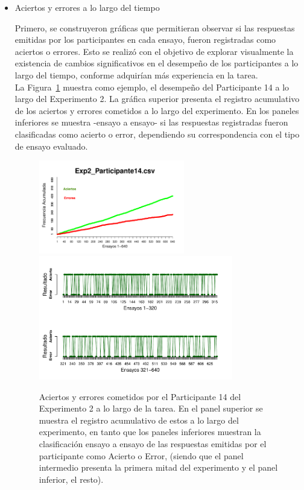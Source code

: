 \begin{itemize}
\item Aciertos y errores a lo largo del tiempo

Primero, se construyeron gráficas que permitieran observar si las respuestas emitidas por los participantes en cada ensayo, fueron registradas como aciertos o errores. Esto se realizó con el objetivo de explorar visualmente la existencia de cambios significativos en el desempeño de los participantes a lo largo del tiempo, conforme adquirían más experiencia en la tarea.\\

La Figura~\ref{fig:Success_E2_P14} muestra como ejemplo, el desempeño del Participante 14 a lo largo del Experimento 2. La gráfica superior presenta el registro acumulativo de los aciertos y errores cometidos a lo largo del experimento. En los paneles inferiores se muestra -ensayo a ensayo- si las respuestas registradas fueron clasificadas como acierto o error, dependiendo su correspondencia con el tipo de ensayo evaluado.\\

\begin{figure}[th]
\centering
\includegraphics[width=0.60\textwidth]{Figures/SuccessCumulative_Exp2_P14} \\
\includegraphics[width=0.80\textwidth]{Figures/Success_Exp2_P14}
\caption[Aciertos y errores a lo largo del tiempo: Participante ejemplar]{Aciertos y errores cometidos por el Participante 14 del Experimento 2 a lo largo de la tarea. En el panel superior se muestra el registro acumulativo de estos a lo largo del experimento, en tanto que los paneles inferiores muestran la clasificación ensayo a ensayo de las respuestas emitidas por el participante como Acierto o Error, (siendo que el panel intermedio presenta la primera mitad del experimento y el panel inferior, el resto).}
\label{fig:Success_E2_P14}
\end{figure}


\end{itemize}
